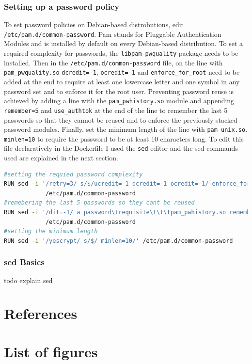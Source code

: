 \documentclass[a4paper]{article}
\newcommand{\abc}{\hfill \break}
\begin{document}
\subsubsection{Setting up a password policy}
To set password policies on Debian-based distrobutions, edit \texttt{/etc/pam.d/common-password}. Pam stands for Pluggable Authentication Modules and is installed by default on every Debian-based distribution.\cite{password-policies-1}\cite{password-policies-2} \abc
To set a required complexity for passwords, the \texttt{libpam-pwquality} package needs to be installed. Then in the \texttt{/etc/pam.d/common-password} file, on the line with \texttt{pam\_pwquality.so} \texttt{dcredit=-1}, \texttt{ocredit=-1} and \texttt{enforce\_for\_root} need to be added at the end to require at least one lowercase letter and one symbol in any password set and to enforce it for the root user.\abc
Preventing password reuse is achieved by adding a line with the \texttt{pam\_pwhistory.so} module and appending \texttt{remember=5} and \texttt{use\_authtok} at the end of the line to remember the last 5 passwords so that they cannot be reused and to enforce the previously stacked password modules.\cite{password-policies-2}
Finally, set the minimum length of the line with \texttt{pam\_unix.so}. \texttt{minlen=10} to require the password to be at least 10 characters long. \abc
To edit this file declaratively in the Dockerfile I used the \texttt{sed} editor and the sed commands used are explained in the next section.
\begin{lstlisting}[language=bash]
#setting the requied password complexity
RUN sed -i '/retry=3/ s/$/ucredit=-1 dcredit=-1 ocredit=-1/ enforce_for_root'\
            /etc/pam.d/common-password
#remebering the last 5 passwords so they cant be reused
RUN sed -i '/dit=-1/ a password\trequisite\t\t\tpam_pwhistory.so remember=5 use_authtok'\
            /etc/pam.d/common-password
#setting the minimum length
RUN sed -i '/yescrypt/ s/$/ minlen=10/' /etc/pam.d/common-password
\end{lstlisting}
\subsubsection{sed Basics}
todo explain sed

\newpage
\section{References}

\newpage
\section{List of figures}

\listoffigures
\end{document}
